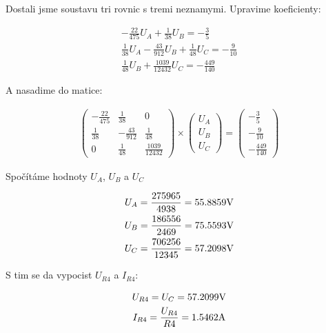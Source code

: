 Dostali jsme soustavu tri rovnic s tremi neznamymi. Upravime koeficienty:

\begin{gather*}
    - \frac{22}{475} U_{A} + \frac{1}{38} U_{B} = - \frac{3}{5} \\
    \frac{1}{38} U_{A} - \frac{43}{912} U_{B} + \frac{1}{48} U_{C} = - \frac{9}{10}  \\
    \frac{1}{48} U_{B} + \frac{1039}{12432} U_{C} = - \frac{449}{140}
\end{gather*}

A nasadime do matice:

\begin{gather*}
    \begin{pmatrix}
        -\frac{22}{475} & \frac{1}{38}    & 0 \\
        \frac{1}{38}    & -\frac{43}{912} & \frac{1}{48} \\
        0               & \frac{1}{48}    & \frac{1039}{12432}
    \end{pmatrix}
    \times
    \begin{pmatrix}
        U_{A} \\
        U_{B} \\
        U_{C}
    \end{pmatrix}
    =
    \begin{pmatrix}
        - \frac{3}{5} \\
        - \frac{9}{10}  \\
        - \frac{449}{140}
    \end{pmatrix}
\end{gather*}

Spočítáme hodnoty $U_{A}$, $U_{B}$ a $U_{C}$

\begin{gather*}
    U_{A} = \frac{275965}{4938} = 55.8859 \Vo \\
    U_{B} = \frac{186556}{2469} = 75.5593 \Vo \\
    U_{C} = \frac{706256}{12345} = 57.2098 \Vo
\end{gather*}

S tim se da vypocist $U_{R4}$ a $I_{R4}$:

\begin{gather*}
    U_{R4} = U_{C} = 57.2099 \Vo \\
    I_{R4} = \frac{U_{R4}}{R4} = 1.5462 \Am
\end{gather*}
